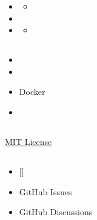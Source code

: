 \begin{itemize}
\item
  \begin{itemize}
  \item
    \faLightbulb
  \end{itemize}
\item
  \faPencil
\item
  \begin{itemize}
  \tightlist
  \item
  \end{itemize}
\end{itemize}

\hypertarget{section-22}{%
\subsection{}\label{section-22}}

\begin{itemize}
\item
  \important{}
\item
  \important{}
\item
  \important{}Docker
\item
  \important{}
\end{itemize}

\hypertarget{section-23}{%
\subsection{}\label{section-23}}

\href{LICENSE}{MIT License}

\hypertarget{section-24}{%
\subsection{}\label{section-24}}

\begin{itemize}
\tightlist
\item
  {[}{]}
\item
  GitHub Issues
\item
  GitHub Discussions
\end{itemize}

\hypertarget{section-25}{%
\subsection{}\label{section-25}}

\hypertarget{section-26}{%
\subsection{}\label{section-26}}

